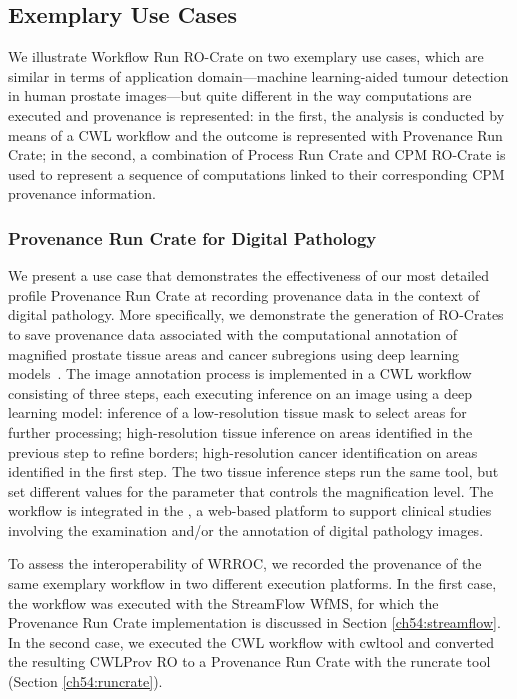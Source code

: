 \subsection{Exemplary Use Cases}\label{ch54:exemplary-use-cases}

We illustrate Workflow Run RO-Crate on two exemplary use cases, which are similar in terms of application domain---machine learning-aided tumour detection in human prostate images---but quite different in the way computations are executed and provenance is represented: in the first, the analysis is conducted by means of a \acrshort{CWL} workflow and the outcome is represented with Provenance Run Crate; in the second, a combination of Process Run Crate and CPM RO-Crate is used to represent a sequence of computations linked to their corresponding CPM provenance information.


\subsubsection{Provenance Run Crate for Digital Pathology}\label{ch54:provenance-run-crate-for-digital-pathology}

We present a use case that demonstrates the effectiveness of our most detailed profile Provenance Run Crate at recording provenance data in the context of digital pathology.
More specifically, we demonstrate the generation of RO-Crates to save provenance data associated with the computational annotation of magnified prostate tissue areas and cancer subregions using deep learning models~\cite{Del Rio 2022}.
The image annotation process is implemented in a CWL workflow consisting of three steps, each executing inference on an image using a deep learning model: inference of a low-resolution tissue mask to select areas for further processing;
high-resolution tissue inference on areas identified in the previous step to refine borders; high-resolution cancer identification on areas identified in the first step.
The two tissue inference steps run the same tool, but set different values for the parameter that controls the magnification level.
The workflow is integrated in the 
, a web-based platform to support clinical studies involving the examination and/or the annotation of digital pathology images.

To assess the interoperability of \acrshort{WRROC}, we recorded the provenance of the same exemplary workflow in two different execution platforms.
In the first case, the workflow was executed with the StreamFlow WfMS, for which the Provenance Run Crate implementation is discussed in Section \vref{ch54:streamflow}.
In the second case, we executed the CWL workflow with cwltool and converted the resulting CWLProv RO to a Provenance Run Crate with the runcrate tool (Section \vref{ch54:runcrate}).

